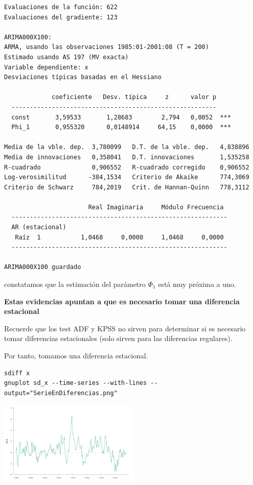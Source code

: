 \documentclass[10pt]{article}
\begin{document}
\begin{verbatim}
Evaluaciones de la función: 622
Evaluaciones del gradiente: 123

ARIMA000X100:
ARMA, usando las observaciones 1985:01-2001:08 (T = 200)
Estimado usando AS 197 (MV exacta)
Variable dependiente: x
Desviaciones típicas basadas en el Hessiano

             coeficiente   Desv. típica     z      valor p
  --------------------------------------------------------
  const       3,59533       1,28683        2,794   0,0052  ***
  Phi_1       0,955320      0,0148914     64,15    0,0000  ***

Media de la vble. dep.  3,780099   D.T. de la vble. dep.   4,838896
Media de innovaciones   0,358041   D.T. innovaciones       1,535258
R-cuadrado              0,906552   R-cuadrado corregido    0,906552
Log-verosimilitud      -384,1534   Criterio de Akaike      774,3069
Criterio de Schwarz     784,2019   Crit. de Hannan-Quinn   778,3112

                       Real Imaginaria     Módulo Frecuencia
  -----------------------------------------------------------
  AR (estacional)
   Raíz  1           1,0468     0,0000     1,0468     0,0000
  -----------------------------------------------------------

ARIMA000X100 guardado
\end{verbatim}

constatamos que la estimación del parámetro \(\Phi_1\) está muy próxima a uno.

\textbf{Estas evidencias apuntan a que es necesario tomar una diferencia
estacional}

Recuerde que los test ADF y KPSS no sirven para determinar si es
necesario tomar diferencias estacionales (solo sirven para las
diferencias regulares).

Por tanto, tomamos una diferencia estacional.

\begin{verbatim}
sdiff x
gnuplot sd_x --time-series --with-lines --output="SerieEnDiferencias.png"
\end{verbatim}

\begin{center}
\includegraphics[width=0.5\textwidth]{./SegundoEjercicioIdentificacionARIMA/SerieEnDiferencias.png}
\end{center}
\end{document}
